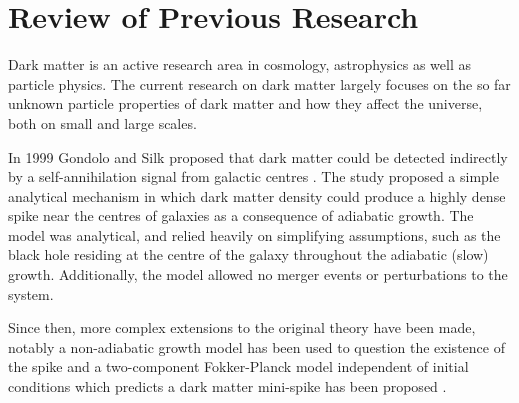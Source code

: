 \documentclass[12pt]{article}
\begin{document}
\section{Review of Previous Research}









Dark matter is an active research area in cosmology, astrophysics as well as particle physics. 
The current research on dark matter largely focuses on the so far 
unknown particle properties of dark matter and how they affect the universe, 
both on small and large scales. %

In 1999 Gondolo and Silk proposed that dark matter could be detected 
indirectly by a self-annihilation signal from galactic centres \citep{GS_1999}. %
The study proposed a simple analytical mechanism in which dark matter density could produce a highly dense spike near the centres of galaxies 
as a consequence of adiabatic growth. The model was analytical, and relied heavily on simplifying assumptions, such as the black hole residing 
at the centre of the galaxy throughout the adiabatic (slow) growth. Additionally, 
the model allowed no merger events or perturbations to the system.%

Since then, more complex extensions to the original theory have been made, notably a non-adiabatic 
growth model \citep{ullio2001spike_criticism} has been used to 
question the existence of the spike and a two-component Fokker-Planck model independent 
of initial conditions which predicts a dark matter mini-spike 
has been proposed \citep{gnedin_primack_2004}.
\end{document}
